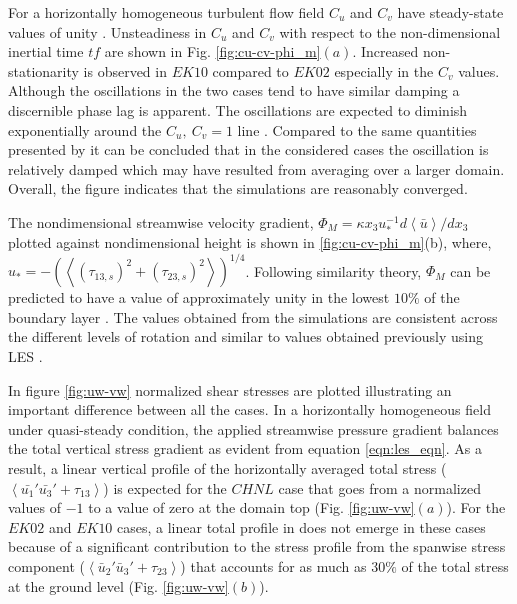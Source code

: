\documentclass{amsart}
\begin{document}
\noindent For a horizontally homogeneous turbulent flow field $C_u$ and $C_v$ have steady-state values of unity  \citep{book-garrat-blm}. Unsteadiness in $C_u$ and $C_v$ with respect to the non-dimensional inertial time $tf$ are shown in Fig.  \ref{fig:cu-cv-phi_m}$(a)$. Increased non-stationarity is observed in $EK10$ compared to $EK02$ especially in the $C_v$ values. Although the oscillations in the two cases tend to have similar damping a discernible phase lag is apparent. The oscillations are expected to diminish  exponentially around the  $C_{u},\ C_{v}=1$ line \citep{book-garrat-blm}. Compared to the same quantities presented by \citet{andren_brown_qjrm_94} it can be concluded that in the considered cases the oscillation is relatively damped which may have resulted from averaging over a larger domain. Overall, the figure indicates that the simulations are reasonably converged. 

The nondimensional streamwise velocity gradient, $\Phi_M=\kappa x_3 u_*^{-1} d\left < \bar{u} \right >/dx_3$ plotted against nondimensional height is shown in \ref{fig:cu-cv-phi_m}(b), where, $u_*= -(\left < (\tau_{13,s})^2 + ( \tau_{23,s})^2\right >)^{1/4}$. Following similarity theory, $\Phi_M$ can be predicted to have a value of approximately unity in the lowest $10\%$ of the boundary layer \citep{book-garrat-blm, stoll_blm_2006}. The values obtained from the simulations are consistent across the different levels of rotation and similar to values obtained previously using LES \citep{stoll_blm_2006,Bouzeid_pof_2005,andren_brown_qjrm_94}. 

In figure \ref{fig:uw-vw} normalized shear stresses are plotted illustrating an important difference between all the cases. In a horizontally homogeneous field under quasi-steady condition, the applied streamwise pressure gradient balances the total vertical stress gradient as evident from equation \ref{eqn:les_eqn}. As a result, a linear vertical profile of the horizontally averaged total stress ($\left <\bar{u_1}'\bar{u_3}'+\tau_{13} \right>$)  is expected for the $CHNL$ case that goes from a normalized values of $-1$ to a value of zero at the domain top (Fig. \ref{fig:uw-vw}$(a)$). For the $EK02$ and $EK10$ cases, a linear total profile in does not emerge in these cases because of a significant contribution to the stress profile from  the spanwise stress component ($\left <\bar{u}_{2}'\bar{u}_{3}'+\tau_{23} \right>$) that accounts for as much as $30\%$ of the total stress at the ground level (Fig. \ref{fig:uw-vw}$(b)$). 
\end{document}
